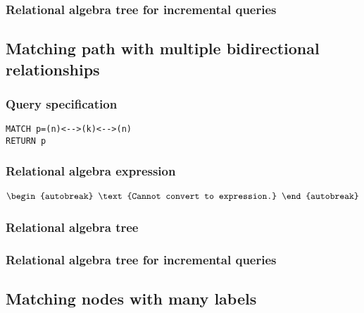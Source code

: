 \subsubsection*{Relational algebra tree for incremental queries}


\subsection{Matching path with multiple bidirectional relationships}

\subsubsection*{Query specification}

\begin{lstlisting}
MATCH p=(n)<-->(k)<-->(n)
RETURN p
\end{lstlisting}

\subsubsection*{Relational algebra expression}

\begin{align*}
\begin{autobreak}
\text{Cannot convert to expression.}
\end{autobreak}
\end{align*}

\subsubsection*{Relational algebra tree}


\subsubsection*{Relational algebra tree for incremental queries}


\subsection{Matching nodes with many labels}

